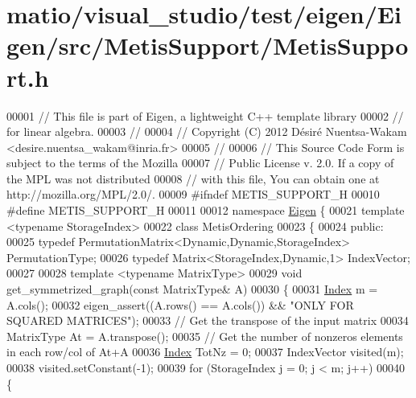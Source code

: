 \hypertarget{matio_2visual__studio_2test_2eigen_2_eigen_2src_2_metis_support_2_metis_support_8h_source}{}\section{matio/visual\+\_\+studio/test/eigen/\+Eigen/src/\+Metis\+Support/\+Metis\+Support.h}
\label{matio_2visual__studio_2test_2eigen_2_eigen_2src_2_metis_support_2_metis_support_8h_source}

\begin{DoxyCode}
00001 \textcolor{comment}{// This file is part of Eigen, a lightweight C++ template library}
00002 \textcolor{comment}{// for linear algebra.}
00003 \textcolor{comment}{//}
00004 \textcolor{comment}{// Copyright (C) 2012 Désiré Nuentsa-Wakam <desire.nuentsa\_wakam@inria.fr>}
00005 \textcolor{comment}{//}
00006 \textcolor{comment}{// This Source Code Form is subject to the terms of the Mozilla}
00007 \textcolor{comment}{// Public License v. 2.0. If a copy of the MPL was not distributed}
00008 \textcolor{comment}{// with this file, You can obtain one at http://mozilla.org/MPL/2.0/.}
00009 \textcolor{preprocessor}{#ifndef METIS\_SUPPORT\_H}
00010 \textcolor{preprocessor}{#define METIS\_SUPPORT\_H}
00011 
00012 \textcolor{keyword}{namespace }\hyperlink{namespace_eigen}{Eigen} \{
00021 \textcolor{keyword}{template} <\textcolor{keyword}{typename} StorageIndex>
00022 \textcolor{keyword}{class }MetisOrdering
00023 \{
00024 \textcolor{keyword}{public}:
00025   \textcolor{keyword}{typedef} PermutationMatrix<Dynamic,Dynamic,StorageIndex> PermutationType;
00026   \textcolor{keyword}{typedef} Matrix<StorageIndex,Dynamic,1> IndexVector; 
00027   
00028   \textcolor{keyword}{template} <\textcolor{keyword}{typename} MatrixType>
00029   \textcolor{keywordtype}{void} get\_symmetrized\_graph(\textcolor{keyword}{const} MatrixType& A)
00030   \{
00031     \hyperlink{namespace_eigen_a62e77e0933482dafde8fe197d9a2cfde}{Index} m = A.cols(); 
00032     eigen\_assert((A.rows() == A.cols()) && \textcolor{stringliteral}{"ONLY FOR SQUARED MATRICES"});
00033     \textcolor{comment}{// Get the transpose of the input matrix }
00034     MatrixType At = A.transpose(); 
00035     \textcolor{comment}{// Get the number of nonzeros elements in each row/col of At+A}
00036     \hyperlink{namespace_eigen_a62e77e0933482dafde8fe197d9a2cfde}{Index} TotNz = 0; 
00037     IndexVector visited(m); 
00038     visited.setConstant(-1); 
00039     \textcolor{keywordflow}{for} (StorageIndex j = 0; j < m; j++)
00040     \{

\end{DoxyCode}

